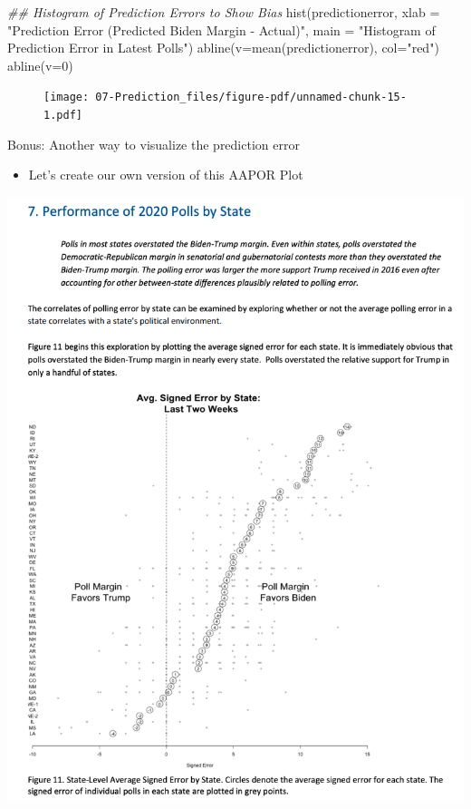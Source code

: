 \documentclass[
  letterpaper,
  DIV=11,
  numbers=noendperiod]{scrreprt}
\newenvironment{Shaded}{\begin{snugshade}}{\end{snugshade}}
\newcommand{\AttributeTok}[1]{\textcolor[rgb]{0.40,0.45,0.13}{#1}}
\newcommand{\DecValTok}[1]{\textcolor[rgb]{0.68,0.00,0.00}{#1}}
\newcommand{\DocumentationTok}[1]{\textcolor[rgb]{0.37,0.37,0.37}{\textit{#1}}}
\newcommand{\FunctionTok}[1]{\textcolor[rgb]{0.28,0.35,0.67}{#1}}
\newcommand{\NormalTok}[1]{\textcolor[rgb]{0.00,0.23,0.31}{#1}}
\newcommand{\StringTok}[1]{\textcolor[rgb]{0.13,0.47,0.30}{#1}}
\providecommand{\tightlist}{%
  \setlength{\itemsep}{0pt}\setlength{\parskip}{0pt}}\usepackage{longtable,booktabs,array}
\begin{document}
\begin{Shaded}
\begin{Highlighting}[]
\DocumentationTok{\#\# Histogram of Prediction Errors to Show Bias}
\FunctionTok{hist}\NormalTok{(predictionerror, }
     \AttributeTok{xlab =} \StringTok{"Prediction Error (Predicted Biden Margin {-} Actual)"}\NormalTok{,}
     \AttributeTok{main =} \StringTok{"Histogram of Prediction Error in Latest Polls"}\NormalTok{)}
\FunctionTok{abline}\NormalTok{(}\AttributeTok{v=}\FunctionTok{mean}\NormalTok{(predictionerror), }\AttributeTok{col=}\StringTok{"red"}\NormalTok{)}
\FunctionTok{abline}\NormalTok{(}\AttributeTok{v=}\DecValTok{0}\NormalTok{)}
\end{Highlighting}
\end{Shaded}

\begin{figure}[H]

{\centering \texttt{[image: 07-Prediction\_files/figure-pdf/unnamed-chunk-15-1.pdf]}

}

\end{figure}

Bonus: Another way to visualize the prediction error

\begin{itemize}
\tightlist
\item
  Let's create our own version of this AAPOR Plot
\end{itemize}

\includegraphics{images/aapor20.png}
\end{document}

